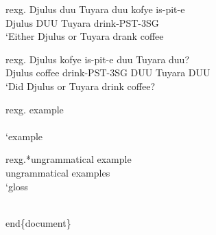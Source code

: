 \documentclass{article}
\begin{document}
rexg. Djulus duu Tuyara duu kofye is-pit-e\\
Djulus DUU Tuyara drink-PST-3SG\\
`Either Djulus or Tuyara drank coffee

rexg. Djulus kofye is-pit-e duu Tuyara duu?\\
Djulus coffee drink-PST-3SG DUU Tuyara DUU\\
`Did Djulus or Tuyara drink coffee?

rexg. example\\
\\
`example

rexg.*ungrammatical example\\
ungrammatical examples\\
`gloss

\\end\{document\}
\end{document}
